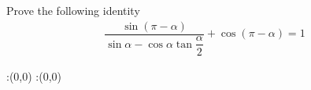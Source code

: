 
%
%
%
%
% 
% 

\question[4] Prove the following identity
\begin{align}
  \dfrac{\sin(\pi - \alpha)}{\sin\alpha - 
  	\cos\alpha\tan\dfrac{\alpha}{2}}
  	+ \cos(\pi - \alpha) = 1 \nonumber
\end{align}


\ifprintanswers
  \begin{marginfigure}
      :(0,0)
      :(0,0)
    \figdrawbegin{}
      \figdrawline [100,101]
    \figdrawend
    \figvisu{\figBoxA}{}{%
    }
    \centerline{\box\figBoxA}
  \end{marginfigure}
\fi 

